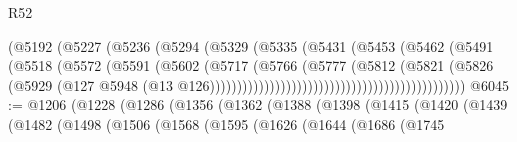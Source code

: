 \begin{lexlean}{R52}
\begin{coremodule}
                                                    (@5192
                                                      (@5227
                                                        (@5236
                                                          (@5294
                                                            (@5329
                                                              (@5335
                                                                (@5431
                                                                  (@5453
                                                                    (@5462
                                                                      (@5491
                                                                        (@5518
                                                                          (@5572
                                                                            (@5591
                                                                              (@5602
                                                                                (@5717
                                                                                  (@5766
                                                                                    (@5777
                                                                                      (@5812
                                                                                        (@5821
                                                                                          (@5826
                                                                                            (@5929
                                                                                              (@127
                                                                                                @5948
                                                                                                (@13
                                                                                                  @126)))))))))))))))))))))))))))))))))))))))))))))))
@6045 := @1206
    (@1228
      (@1286
        (@1356
          (@1362
            (@1388
              (@1398
                (@1415
                  (@1420
                    (@1439
                      (@1482
                        (@1498
                          (@1506
                            (@1568
                              (@1595
                                (@1626
                                  (@1644
                                    (@1686
                                      (@1745

\end{coremodule}
\end{lexlean}
